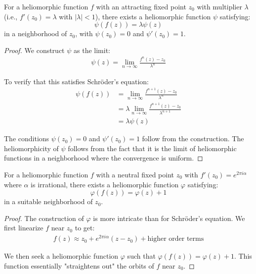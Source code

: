 \begin{definition}
\begin{enumerate}
\begin{definition}
\begin{definition}
\begin{theorem}
For a heliomorphic function $f$ with an attracting fixed point $z_0$ with multiplier $\lambda$ (i.e., $f'(z_0) = \lambda$ with $|\lambda| < 1$), there exists a heliomorphic function $\psi$ satisfying:
\begin{equation}
\psi(f(z)) = \lambda \psi(z)
\end{equation}
in a neighborhood of $z_0$, with $\psi(z_0) = 0$ and $\psi'(z_0) = 1$.
\end{theorem}

\begin{proof}
We construct $\psi$ as the limit:
\begin{align}
\psi(z) = \lim_{n\to\infty} \frac{f^n(z) - z_0}{\lambda^n}
\end{align}

To verify that this satisfies Schröder's equation:
\begin{align}
\psi(f(z)) &= \lim_{n\to\infty} \frac{f^{n+1}(z) - z_0}{\lambda^n}\\
&= \lambda \lim_{n\to\infty} \frac{f^{n+1}(z) - z_0}{\lambda^{n+1}}\\
&= \lambda \psi(z)
\end{align}

The conditions $\psi(z_0) = 0$ and $\psi'(z_0) = 1$ follow from the construction. The heliomorphicity of $\psi$ follows from the fact that it is the limit of heliomorphic functions in a neighborhood where the convergence is uniform.
\end{proof}

\begin{theorem}
For a heliomorphic function $f$ with a neutral fixed point $z_0$ with $f'(z_0) = e^{2\pi i \alpha}$ where $\alpha$ is irrational, there exists a heliomorphic function $\varphi$ satisfying:
\begin{equation}
\varphi(f(z)) = \varphi(z) + 1
\end{equation}
in a suitable neighborhood of $z_0$.
\end{theorem}

\begin{proof}
The construction of $\varphi$ is more intricate than for Schröder's equation. We first linearize $f$ near $z_0$ to get:
\begin{align}
f(z) \approx z_0 + e^{2\pi i \alpha}(z - z_0) + \text{higher order terms}
\end{align}

We then seek a heliomorphic function $\varphi$ such that $\varphi(f(z)) = \varphi(z) + 1$. This function essentially "straightens out" the orbits of $f$ near $z_0$.


\end{proof}
\end{definition}
\end{definition}
\end{enumerate}
\end{definition}
